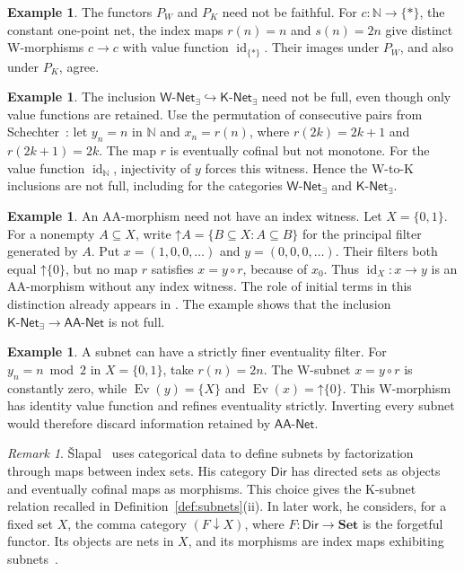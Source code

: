 \documentclass[11pt,a4paper]{article}
\theoremstyle{definition}
\newtheorem{example}[theorem]{Example}
\theoremstyle{remark}
\newtheorem{remark}[theorem]{Remark}
\newcommand{\Wex}{\mathsf{W\text{-}Net}_{\exists}}
\newcommand{\Kex}{\mathsf{K\text{-}Net}_{\exists}}
\newcommand{\NetAA}{\mathsf{AA\text{-}Net}}
\newcommand{\NN}{\mathbb N}
\newcommand{\Ev}{\operatorname{Ev}}
\newcommand{\id}{\operatorname{id}}
\newcommand{\up}[1]{\mathord{\uparrow}#1}
\begin{document}
\begin{example}\label{ex:witness}
The functors \(P_W\) and \(P_K\) need not be faithful.
For \(c:\NN\to\{*\}\), the constant one-point net, the index maps
\(r(n)=n\) and \(s(n)=2n\) give distinct W-morphisms \(c\to c\) with
value function \(\id_{\{*\}}\). Their images under \(P_W\), and also
under \(P_K\), agree.
\end{example}

\begin{example}\label{ex:swap}
The inclusion \(\Wex\hookrightarrow\Kex\) need not be full, even
though only value functions are retained. Use the permutation of
consecutive pairs from Schechter~\cite[Section 7.16(b)]{Schechter}:
let \(y_n=n\) in \(\NN\) and \(x_n=r(n)\), where
\(r(2k)=2k+1\) and \(r(2k+1)=2k\). The map \(r\) is eventually
cofinal but not monotone. For the value function \(\id_{\NN}\),
injectivity of \(y\) forces this witness. Hence the W-to-K inclusions
are not full, including for the categories \(\Wex\) and \(\Kex\).
\end{example}

\begin{example}\label{ex:head}
An AA-morphism need not have an index witness.
Let \(X=\{0,1\}\). For a nonempty \(A\subseteq X\), write
\(\up A=\{B\subseteq X:A\subseteq B\}\) for the principal filter
generated by \(A\). Put \(x=(1,0,0,\ldots)\) and
\(y=(0,0,0,\ldots)\). Their filters both equal \(\up{\{0\}}\), but
no map \(r\) satisfies \(x=y\circ r\), because of \(x_0\).
Thus \(\id_X:x\to y\) is an AA-morphism without any index witness.
The role of initial terms in this distinction already appears in
\cite[Example 2.4]{AA}. The example shows that the inclusion
\(\Kex\to\NetAA\) is not full.
\end{example}

\begin{example}\label{ex:parity}
A subnet can have a strictly finer eventuality filter.
For \(y_n=n\bmod2\) in \(X=\{0,1\}\), take \(r(n)=2n\).
The W-subnet \(x=y\circ r\) is constantly zero, while
\(\Ev(y)=\{X\}\) and \(\Ev(x)=\up{\{0\}}\).
This W-morphism has identity value function and refines eventuality
strictly. Inverting every
subnet would therefore discard information retained by \(\NetAA\).
\end{example}

\begin{remark}
\v{S}lapal~\cite[Definition 1.1 and Example 1.2(1)]{Slapal1996}
uses categorical data to define subnets by factorization through maps
between index sets. His category \(\mathsf{Dir}\) has directed sets as objects and
eventually cofinal maps as morphisms. This choice gives the K-subnet
relation recalled in Definition~\ref{def:subnets}(ii).
In later work, he considers, for a fixed set \(X\), the comma category
\((F\downarrow X)\), where \(F:\mathsf{Dir}\to\mathbf{Set}\) is the
forgetful functor. Its objects are nets in \(X\), and its morphisms
are index maps exhibiting subnets~\cite[Definition 2.1 and Example 2.2(2)]{Slapal2016}.
\end{remark}
\end{document}
